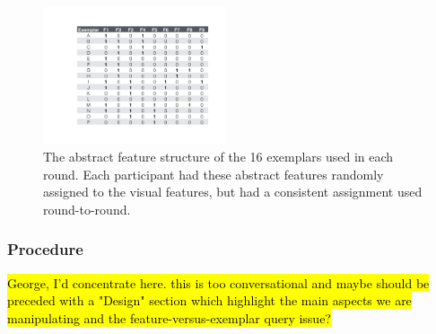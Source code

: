 \documentclass[10pt,letterpaper]{article}
\begin{document}
\begin{figure}[h]
  \centering
  \includegraphics[width=0.48\textwidth]{figures/feature_table}
  \caption{The abstract feature structure of the 16 exemplars used in each round. 
Each participant had these abstract features randomly assigned to the visual 
features, but had a consistent assignment used round-to-round.}
  \label{fig:feature_table}
\end{figure} 



\subsubsection{Procedure}

\hl{George, I'd concentrate here.  this is too conversational and maybe
should be preceded with a "Design" section which highlight the main
aspects we are manipulating and the feature-versus-exemplar query issue?}

\end{document}
